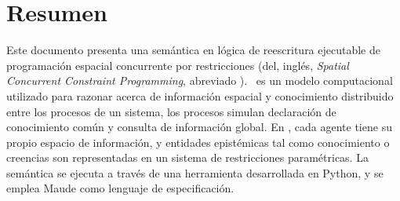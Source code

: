 
\chapter*{Resumen}

Este documento presenta una sem\'antica en l\'ogica de reescritura ejecutable de programaci\'on espacial concurrente por restricciones (del, ingl\'es, \textit{Spatial Concurrent Constraint Programming}, abreviado \SCCP). \SCCP \ es un modelo computacional utilizado para razonar acerca de informaci\'on espacial y conocimiento distribuido entre los procesos de un sistema, los procesos simulan declaraci\'on de conocimiento com\'un  y consulta de informaci\'on global. En \SCCP, cada agente tiene su propio espacio de informaci\'on, y entidades epist\'emicas tal como conocimiento o creencias son representadas en un sistema de restricciones param\'etricas. La sem\'antica se ejecuta a trav\'es de una herramienta desarrollada en Python, y se emplea Maude como lenguaje de especificaci\'on.